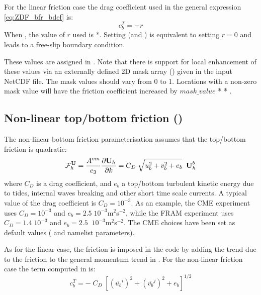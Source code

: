 \documentclass[../main/NEMO_manual]{subfiles}
\begin{document}
 For the linear friction case the drag coefficient used in the general expression \autoref{eq:ZDF_bfr_bdef} is:
\[
    c_b^T = - r
\]
When , the value of $r$ used is *.
Setting  (and ) is equivalent to setting $r=0$ and leads to a free-slip boundary condition.

These values are assigned in .
Note that there is support for local enhancement of these values via an externally defined 2D mask array
() given in the  input NetCDF file.
The mask values should vary from 0 to 1.
Locations with a non-zero mask value will have the friction coefficient increased by
$mask\_value$ *  * .

\subsection[Non-linear top/bottom friction (\forcode{ln_non_lin})]{Non-linear top/bottom friction (\protect{})}
\label{subsec:ZDF_drg_nonlinear}

The non-linear bottom friction parameterisation assumes that the top/bottom friction is quadratic:
\[
  {\cal F}_h^\textbf{U} = \frac{A^{vm}}{e_3 }\frac{\partial \textbf {U}_h
  }{\partial k}=C_D \;\sqrt {u_b ^2+v_b ^2+e_b } \;\; \textbf {U}_h^b
\]
where $C_D$ is a drag coefficient, and $e_b $ a top/bottom turbulent kinetic energy due to tides,
internal waves breaking and other short time scale currents.
A typical value of the drag coefficient is $C_D = 10^{-3} $.
As an example, the CME experiment \citep{treguier_JGR92} uses $C_D = 10^{-3}$ and
$e_b = 2.5\;10^{-3}$m$^2$\;s$^{-2}$, while the FRAM experiment \citep{killworth_JPO92} uses $C_D = 1.4\;10^{-3}$ and
$e_b =2.5\;\;10^{-3}$m$^2$\;s$^{-2}$.
The CME choices have been set as default values ( and  namelist parameters).

As for the linear case, the friction is imposed in the code by adding the trend due to
the friction to the general momentum trend in .
For the non-linear friction case the term computed in  is:
\[
    c_b^T = - \; C_D\;\left[ \left(\bar{u_b}^{i}\right)^2 + \left(\bar{v_b}^{j}\right)^2 + e_b \right]^{1/2}
\]
\end{document}
